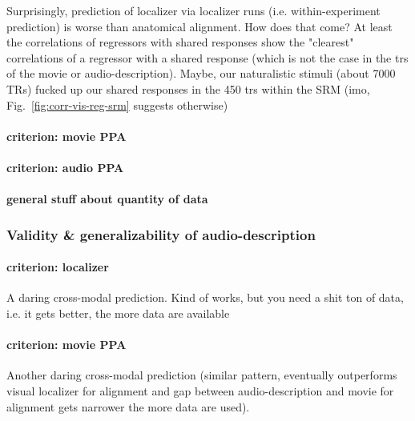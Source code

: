 %
Surprisingly, prediction of localizer via localizer runs (i.e. within-experiment
prediction) is worse than anatomical alignment.
%
How does that come? At least the correlations of regressors with shared
responses show the "clearest" correlations of a regressor with a shared response
(which is not the case in the \acp{tr} of the movie or audio-description).
%
Maybe, our naturalistic stimuli (about 7000 TRs) fucked up our shared responses
in the 450 \acp{tr} within the SRM (imo, Fig.~\ref{fig:corr-vis-reg-srm}
suggests otherwise)


\paragraph{criterion: movie PPA}

\paragraph{criterion: audio PPA}

\paragraph{general stuff about quantity of data}




\subsubsection{Validity \& generalizability of audio-description}





\paragraph{criterion: localizer}
%
A daring cross-modal prediction.
%
Kind of works, but you need a shit ton of data, i.e. it gets better, the more
data are available


\paragraph{criterion: movie PPA}
%
Another daring cross-modal prediction (similar pattern, eventually outperforms
visual localizer for alignment and gap between audio-description and movie for
alignment gets narrower the more data are used).


